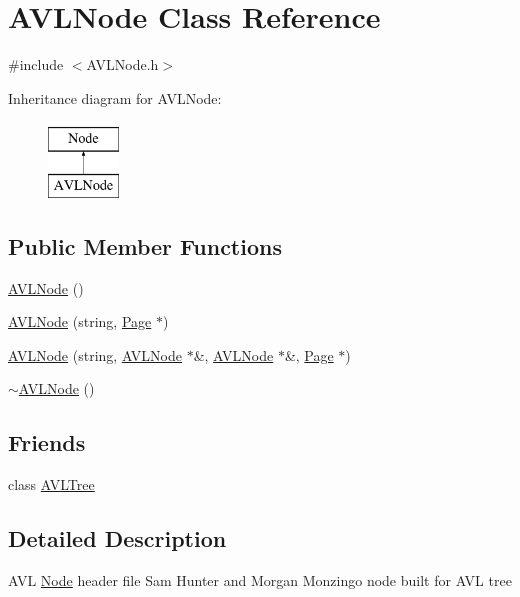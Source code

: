 \hypertarget{class_a_v_l_node}{}\section{A\+V\+L\+Node Class Reference}
\label{class_a_v_l_node}


{\ttfamily \#include $<$A\+V\+L\+Node.\+h$>$}

Inheritance diagram for A\+V\+L\+Node\+:\begin{figure}[H]
\begin{center}
\leavevmode
\includegraphics[height=2.000000cm]{class_a_v_l_node}
\end{center}
\end{figure}
\subsection*{Public Member Functions}
\begin{DoxyCompactItemize}
\item 
\hyperlink{class_a_v_l_node_ab4a77945ebefb824cb3d21a0f9f3a514}{A\+V\+L\+Node} ()
\item 
\hyperlink{class_a_v_l_node_af27568a3d6ad4d83e651a0cc0f4057aa}{A\+V\+L\+Node} (string, \hyperlink{class_page}{Page} $\ast$)
\item 
\hyperlink{class_a_v_l_node_ac549cb5dbe98c28f5335ceaf0f602111}{A\+V\+L\+Node} (string, \hyperlink{class_a_v_l_node}{A\+V\+L\+Node} $\ast$\&, \hyperlink{class_a_v_l_node}{A\+V\+L\+Node} $\ast$\&, \hyperlink{class_page}{Page} $\ast$)
\item 
\hyperlink{class_a_v_l_node_a5b3f7cdff426ea2ac77da59399e6a386}{$\sim$\+A\+V\+L\+Node} ()
\end{DoxyCompactItemize}
\subsection*{Friends}
\begin{DoxyCompactItemize}
\item 
class \hyperlink{class_a_v_l_node_abb802889854b7d6aebdc6c5a9f751b0e}{A\+V\+L\+Tree}
\end{DoxyCompactItemize}


\subsection{Detailed Description}
A\+V\+L \hyperlink{class_node}{Node} header file Sam Hunter and Morgan Monzingo node built for A\+V\+L tree 

